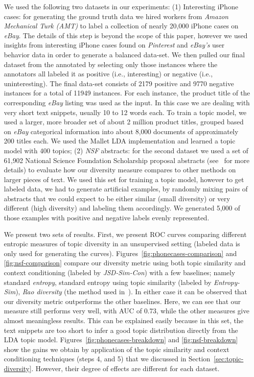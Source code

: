 \documentclass{article} %
\begin{document}
We used the following two datasets in our experiments: (1) Interesting iPhone cases:
for generating the ground truth data we hired workers from {\em Amazon Mechanical Turk (AMT)} to label a collection
of nearly 20,000 iPhone cases on {\em eBay}. The details of this step is beyond the scope of this paper, however we used insights from
interesting iPhone cases found on {\em Pinterest} and {\em eBay's} user behavior data in order to generate a balanced data-set. 
We then pulled our final dataset from the annotated by selecting only those instances where the annotators all labeled it as
positive (i.e., interesting) or negative (i.e., uninteresting). The final data-set consists of 2179 positive and 9770 negative instances for
a total of 11949 instances. For each instance, the product title of
the corresponding {\em eBay} listing was used as the input. In this case we are
dealing with very short text snippets, usually 10 to 12 words each. To
train a topic model, we used a larger, more broader set of about
2 million product titles, grouped based on {\em eBay} categorical information into about 8,000
documents of approximately 200 titles each. We used the Mallet LDA implementation and learned a topic model with $400$ topics; (2) {\em NSF}
abstracts: for the second dataset we used a set of 61,902 National Science Foundation
Scholarship proposal abstracts (see~\cite{bache:2013} for more details) to evaluate how our diversity measure
compares to other methods on larger pieces of text. We used this set
for training a topic model, however to get labeled data, we had to
generate artificial examples, by randomly mixing pairs of abstracts that we
could expect to be either similar (small diversity) or very different
(high diversity) and labeling them accordingly. We generated 5,000 of
those examples with positive and negative labels evenly represented.

We present two sets of results. First, we present
ROC curves comparing different entropic measures of topic diversity in an unsupervised setting 
(labeled data is only used for generating the curves). Figures~\ref{fig:phonecases-comparison} and \ref{fig:nsf-comparison}
compare our diversity metric using both topic similarity and context conditioning (labeled by {\em JSD-Sim-Con}) with a few baselines; namely standard {\em entropy}, standard entropy using topic similarity (labeled by {\em Entropy-Sim}), {\em Rao diversity } (the method used in~\cite{bache:2013}). In either case it can be observed that our diversity metric outperforms the other baselines. Here, we can see that our measure
still performs very well, with AUC of 0.73, while the other measures
give almost meaningless results. This can be explained easily because
in this set, the text snippets are too short to infer a good topic
distribution directly from the LDA topic model. Figures~\ref{fig:phonecases-breakdown} and \ref{fig:nsf-breakdown} show the gains we obtain by application of the topic similarity and context conditioning techniques (steps 4, and 5) that we discussed in Section~\ref{sec:topic-diversity}. However, their degree of effects are different for each
dataset. 
\end{document}
